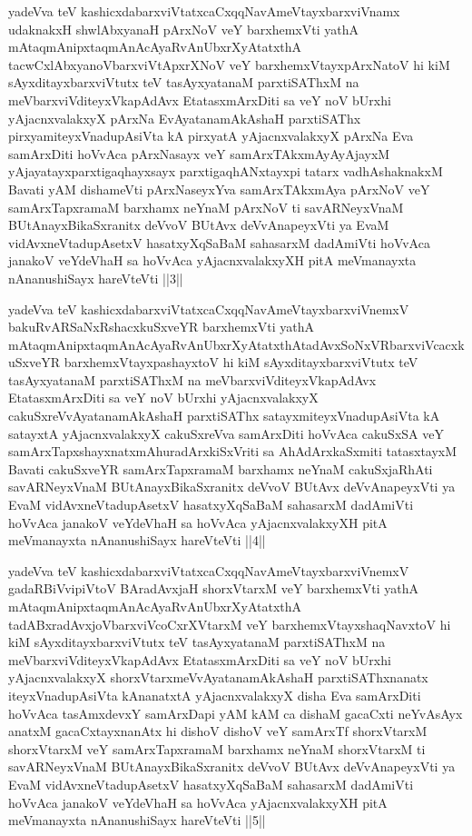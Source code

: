 \begin{kandikeshl}
yadeVva teV kashicxdabarxviVtatxcaCxqqNavAmeVtayxbarxviVnamx udaknakxH shwlAbxyanaH pArxNoV veY barxhemxVti yathA mAtaqmAnipxtaqmAnAcAyaRvAnUbxrXyAtatxthA tacwCxlAbxyanoV\s barxviVtApxrXNoV veY barxhemxVtayxpArxNatoV hi kiM sAyxditayxbarxviVtutx teV tasAyxyatanaM parxtiSAThxM na meV\s barxviVditeyxVkapAdAvx EtatasxmArxDiti sa veY noV bUrxhi yAjacnxvalakxyX pArxNa EvAyatanamAkAshaH parxtiSAThx pirxyamiteyxVnadupAsiVta kA pirxyatA yAjacnxvalakxyX pArxNa Eva samArxDiti hoVvAca pArxNasayx veY samArxTAkxmAyAyAjayxM yAjayatayxparxtigaqhayxsayx parxtigaqhANxtayxpi tatarx vadhAshaknakxM Bavati yAM dishameVti pArxNaseyxYva samArxTAkxmAya pArxNoV veY samArxTapxramaM barxhamx neYnaM pArxNoV ti savARNeyxVnaM BUtAnayxBikaSxranitx deVvoV BUtAvx deVvAnapeyxVti ya EvaM vidAvxneVtadupAsetxV hasatxyXqSaBaM sahasarxM dadAmiVti hoVvAca janakoV veYdeVhaH sa hoVvAca yAjacnxvalakxyXH pitA meV\s manayxta nAnanushiSayx hareVteVti ||3||
\end{kandikeshl}


\begin{kandikeshl}
yadeVva teV kashicxdabarxviVtatxcaCxqqNavAmeVtayxbarxviVnemxV bakuRvARSaNxRshacxkuSxveYR barxhemxVti yathA mAtaqmAnipxtaqmAnAcAyaRvAnUbxrXyAtatxthA\break tadAvxSoNxVR\s barxviVcacxkuSxveYR barxhemxVtayxpashayxtoV hi kiM sAyxditayxbarxviVtutx teV tasAyxyatanaM parxtiSAThxM na meV\s barxviVditeyxVkapAdAvx EtatasxmArxDiti sa veY noV bUrxhi yAjacnxvalakxyX cakuSxreVvAyatanamAkAshaH parxtiSAThx satayxmiteyxVnadupAsiVta kA satayxtA yAjacnxvalakxyX cakuSxreVva samArxDiti hoVvAca cakuSxSA veY samArxTapxshayxnatxmAhuradArxkiSxVriti sa AhAdArxkaSxmiti tatasxtayxM Bavati cakuSxveYR samArxTapxramaM barxhamx neYnaM cakuSxjaRhAti savARNeyxVnaM BUtAnayxBikaSxranitx deVvoV BUtAvx deVvAnapeyxVti ya EvaM vidAvxneVtadupAsetxV hasatxyXqSaBaM sahasarxM dadAmiVti hoVvAca janakoV veYdeVhaH sa hoVvAca yAjacnxvalakxyXH pitA meV\s manayxta nAnanushiSayx hareVteVti ||4||
\end{kandikeshl}


\begin{kandikeshl}
yadeVva teV kashicxdabarxviVtatxcaCxqqNavAmeVtayxbarxviVnemxV gadaRBiVvipiVtoV BAradAvxjaH shorxVtarxM veY barxhemxVti yathA mAtaqmAnipxtaqmAnAcAyaRvAnUbxrXyAtatxthA tadABxradAvxjoV\s barxviVcoCxrXVtarxM veY barxhemxVtayxshaqNavxtoV hi kiM sAyxditayxbarxviVtutx teV tasAyxyatanaM parxtiSAThxM na meV\s barxviVditeyxVkapAdAvx EtatasxmArxDiti sa veY noV bUrxhi yAjacnxvalakxyX shorxVtarxmeVvAyatanamAkAshaH parxtiSAThxnanatx iteyxVnadupAsiVta kAnanatxtA yAjacnxvalakxyX disha Eva samArxDiti hoVvAca tasAmxdevxY samArxDapi yAM kAM ca dishaM gacaCxti neYvAsAyx anatxM gacaCxtayxnanAtx hi dishoV dishoV veY samArxTf shorxVtarxM shorxVtarxM veY samArxTapxramaM barxhamx neYnaM shorxVtarxM ti savARNeyxVnaM BUtAnayxBikaSxranitx deVvoV BUtAvx deVvAnapeyxVti ya EvaM vidAvxneVtadupAsetxV hasatxyXqSaBaM sahasarxM dadAmiVti hoVvAca janakoV veYdeVhaH sa hoVvAca yAjacnxvalakxyXH pitA meV\s manayxta nAnanushiSayx hareVteVti ||5||
\end{kandikeshl}

